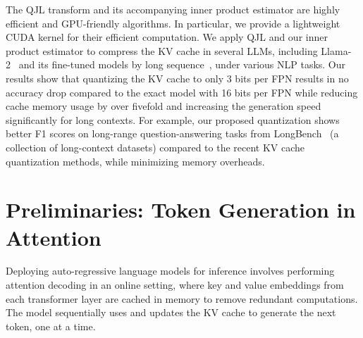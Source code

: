 \documentclass[11pt]{article}
\theoremstyle{plain}
\theoremstyle{definition}
\theoremstyle{remark}
\newcommand{\amir}[1]{\textcolor{red}{Amir: #1}}
\begin{document}
The QJL transform and its accompanying inner product estimator are highly efficient and GPU-friendly algorithms. 
In particular, we provide a lightweight CUDA kernel for their efficient computation. We apply QJL and our inner product estimator to compress the KV cache in several LLMs, including Llama-2~\cite{touvron2023llama} and its fine-tuned models by long sequence~\cite{longchat2023}, under various NLP tasks. 
Our results show that quantizing the KV cache to only 3 bits per FPN results in no accuracy drop compared to the exact model with 16 bits per FPN while reducing cache memory usage by over fivefold and increasing the generation speed significantly for long contexts. 
For example, our proposed quantization shows better F1 scores on long-range question-answering tasks from LongBench~\cite{bai2023longbench} (a collection of long-context datasets) compared to the recent KV cache quantization methods, while minimizing memory overheads.



\section{Preliminaries: Token Generation in Attention}



Deploying auto-regressive language models for inference involves performing attention decoding in an online setting, where key and value embeddings from each transformer layer are cached in memory to remove redundant computations. 
The model sequentially uses and updates the KV cache to generate the next token, one at a time.
\end{document}
